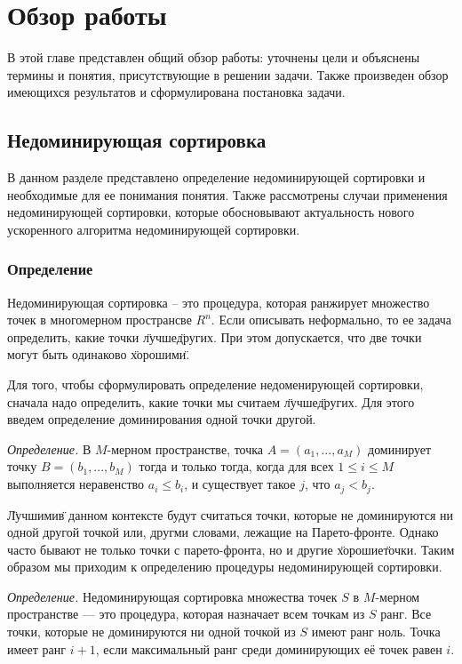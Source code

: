 
\chapter{Обзор работы}
\label{chapter1}

В этой главе представлен общий обзор работы: уточнены цели и объяснены термины и понятия, присутствующие в решении
задачи. Также произведен обзор имеющихся результатов и сформулирована постановка задачи.

\section{Недоминирующая сортировка}

В данном разделе представлено определение недоминирующей сортировки и необходимые для ее понимания понятия.
Также рассмотрены случаи применения недоминирующей сортировки, которые обосновывают актуальность нового ускоренного
алгоритма недоминирующей сортировки.

\subsection{Определение}

Недоминирующая сортировка -- это процедура, которая ранжирует множество точек в многомерном пространсве $R^n$.
Если описывать неформально, то ее задача определить, какие точки \"лучше\" других. При этом допускается, что две точки 
могут быть одинаково \"хорошими\".

Для того, чтобы сформулировать определение недоменирующей сортировки, сначала надо определить, какие точки мы считаем 
\"лучше\" других. Для этого введем определение доминирования одной точки другой.

\textit{Определение.} В $M$-мерном пространстве, точка $A = (a_1,...,a_M)$ доминирует точку $B = (b_1,...,b_M)$
 тогда и только тогда, когда для всех $1 \leq i \leq M$ выполняется неравенство $a_i\leq b_i$, и существует такое $j$, 
 что $a_j < b_j$.

\"Лучшими\" в данном контексте будут считаться точки, которые не доминируются ни одной другой точкой или, другми словами, 
лежащие на Парето-фронте. Однако часто бывают не только точки с парето-фронта, но и другие \"хорошие\" точки. Таким
образом мы приходим к определению процедуры недоминирующей сортировки.

\textit{Определение.} Недоминирующая сортировка множества точек $S$ в $M$-мерном пространстве — это процедура, которая 
назначает всем точкам из $S$ ранг. Все точки, которые не доминируются ни одной точкой из $S$ имеют ранг ноль. Точка 
имеет ранг $i+1$, если максимальный ранг среди доминирующих её точек равен $i$.

